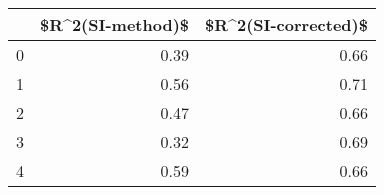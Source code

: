 \begin{tabular}{lrr}
\toprule
{} &  \$R\textasciicircum 2(SI-method)\$ &  \$R\textasciicircum 2(SI-corrected)\$ \\
\midrule
0 &              0.39 &                 0.66 \\
1 &              0.56 &                 0.71 \\
2 &              0.47 &                 0.66 \\
3 &              0.32 &                 0.69 \\
4 &              0.59 &                 0.66 \\
\bottomrule
\end{tabular}
